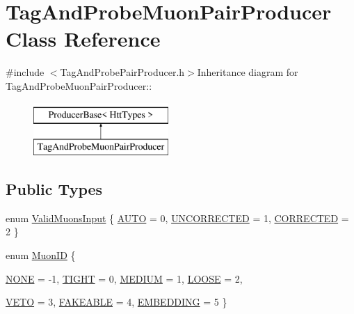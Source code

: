 \hypertarget{classTagAndProbeMuonPairProducer}{
\section{TagAndProbeMuonPairProducer Class Reference}
\label{classTagAndProbeMuonPairProducer}
}


{\ttfamily \#include $<$TagAndProbePairProducer.h$>$}Inheritance diagram for TagAndProbeMuonPairProducer::\begin{figure}[H]
\begin{center}
\leavevmode
\includegraphics[height=2cm]{classTagAndProbeMuonPairProducer}
\end{center}
\end{figure}
\subsection*{Public Types}
\begin{DoxyCompactItemize}
\item 
enum \hyperlink{classTagAndProbeMuonPairProducer_adaf024ea8e217bd1e93cb4193768701d}{ValidMuonsInput} \{ \hyperlink{classTagAndProbeMuonPairProducer_adaf024ea8e217bd1e93cb4193768701da4e2ebe2d46c9c94bbb1a55250a10d578}{AUTO} =  0, 
\hyperlink{classTagAndProbeMuonPairProducer_adaf024ea8e217bd1e93cb4193768701da1a5de02a3032886456b7632c1d6f0d96}{UNCORRECTED} =  1, 
\hyperlink{classTagAndProbeMuonPairProducer_adaf024ea8e217bd1e93cb4193768701daba01a371a03b0d0ea451a2206fe5cedf}{CORRECTED} =  2
 \}
\item 
enum \hyperlink{classTagAndProbeMuonPairProducer_a60f9e6b1f42c503ba52f0cdf54fb8455}{MuonID} \{ \par
\hyperlink{classTagAndProbeMuonPairProducer_a60f9e6b1f42c503ba52f0cdf54fb8455a85451ca86b3501a35ce0f538d68b52e4}{NONE} =  -\/1, 
\hyperlink{classTagAndProbeMuonPairProducer_a60f9e6b1f42c503ba52f0cdf54fb8455a6ef0640cc1c47364161ebf9dc471a3f0}{TIGHT} =  0, 
\hyperlink{classTagAndProbeMuonPairProducer_a60f9e6b1f42c503ba52f0cdf54fb8455af10cf388cc66efe9b4c88f590968134f}{MEDIUM} =  1, 
\hyperlink{classTagAndProbeMuonPairProducer_a60f9e6b1f42c503ba52f0cdf54fb8455a8161405ba568e7aa3e8c245e3359ac30}{LOOSE} =  2, 
\par
\hyperlink{classTagAndProbeMuonPairProducer_a60f9e6b1f42c503ba52f0cdf54fb8455a9200affac8fce23ac0c13b6aade296e5}{VETO} =  3, 
\hyperlink{classTagAndProbeMuonPairProducer_a60f9e6b1f42c503ba52f0cdf54fb8455a2027365660fab2c773b58bf636ae5314}{FAKEABLE} =  4, 
\hyperlink{classTagAndProbeMuonPairProducer_a60f9e6b1f42c503ba52f0cdf54fb8455ad10a4f5371a4aef5c32c1a35bd1e7469}{EMBEDDING} =  5
 \}
\end{DoxyCompactItemize}
